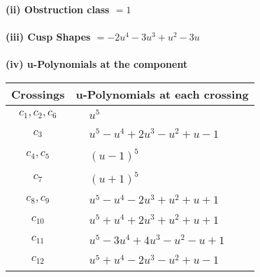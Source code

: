 \documentclass[1p]{elsarticle_modified}
\theoremstyle{definition}
\begin{document}
\flushleft \textbf{(ii) Obstruction class $= 1$}\\~\\
\flushleft \textbf{(iii) Cusp Shapes $= -2 u^4-3 u^3+u^2-3 u$}\\~\\
\newpage\renewcommand{\arraystretch}{1}
\flushleft \textbf{(iv) u-Polynomials at the component}\newline \\
\begin{tabular}{m{50pt}|m{274pt}}
Crossings & \hspace{64pt}u-Polynomials at each crossing \\
\hline $$\begin{aligned}c_{1},c_{2},c_{6}\end{aligned}$$&$\begin{aligned}
&u^5
\end{aligned}$\\
\hline $$\begin{aligned}c_{3}\end{aligned}$$&$\begin{aligned}
&u^5- u^4+2 u^3- u^2+u-1
\end{aligned}$\\
\hline $$\begin{aligned}c_{4},c_{5}\end{aligned}$$&$\begin{aligned}
&(u-1)^5
\end{aligned}$\\
\hline $$\begin{aligned}c_{7}\end{aligned}$$&$\begin{aligned}
&(u+1)^5
\end{aligned}$\\
\hline $$\begin{aligned}c_{8},c_{9}\end{aligned}$$&$\begin{aligned}
&u^5- u^4-2 u^3+u^2+u+1
\end{aligned}$\\
\hline $$\begin{aligned}c_{10}\end{aligned}$$&$\begin{aligned}
&u^5+u^4+2 u^3+u^2+u+1
\end{aligned}$\\
\hline $$\begin{aligned}c_{11}\end{aligned}$$&$\begin{aligned}
&u^5-3 u^4+4 u^3- u^2- u+1
\end{aligned}$\\
\hline $$\begin{aligned}c_{12}\end{aligned}$$&$\begin{aligned}
&u^5+u^4-2 u^3- u^2+u-1
\end{aligned}$\\
\hline
\end{tabular}\\~\\
\end{document}
